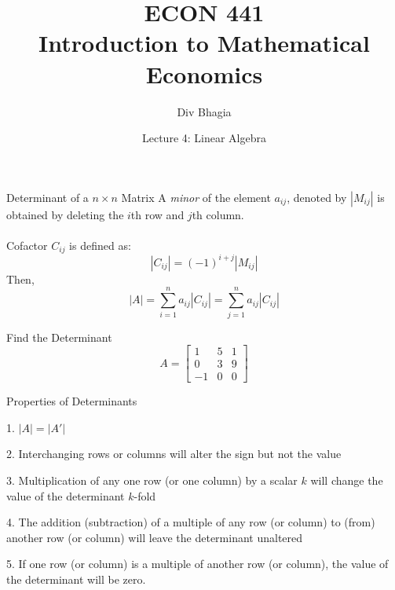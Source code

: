 \documentclass{./../../Latex/teaching_slides}
\begin{document}
\title{ECON 441 \\ \vspace{0.4em} \normalsize Introduction to Mathematical Economics}
\author{Div Bhagia}
\date{Lecture 4: Linear Algebra}

 \begin{frame}
\maketitle
\end{frame}


 \begin{frame}{Determinant of a $n \times n$ Matrix}
A \textit{minor} of the element $a_{ij}$, denoted by $|M_{ij}|$ is obtained by deleting the $i$th row and $j$th column. \\~\\
Cofactor $C_{ij}$ is defined as:
$$ |C_{ij}| = (-1)^{i+j} |M_{ij}| $$
 Then, 
 $$|A| = \sum_{i=1}^n a_{ij} |C_{ij}| = \sum_{j=1}^n a_{ij} |C_{ij}| $$
 \end{frame}
 
 \begin{frame}{Find the Determinant}
\[
A=\left[\begin{array}{ccc}
1 & 5 & 1 \\
0 & 3 & 9 \\
-1 & 0 & 0
\end{array}\right]
\]
 \end{frame}
 
 \begin{frame}{Properties of Determinants}
 \vspace{-0.5em}
\begin{witemize}
\item[1.] $ |A| = |A'|$ 
\item[2.] Interchanging rows or columns will alter the sign but not the value
\item[3.] Multiplication of any one row (or one column) by a scalar $k$ will change the value of the determinant $k$-fold
\item[4.] The addition (subtraction) of a multiple of any row (or column) to (from) another row (or column) will leave the determinant unaltered
\item[5.] If one row (or column) is a multiple of another row (or column), the value of the determinant will be zero.
\end{witemize}
 \end{frame}
 
\end{document}
